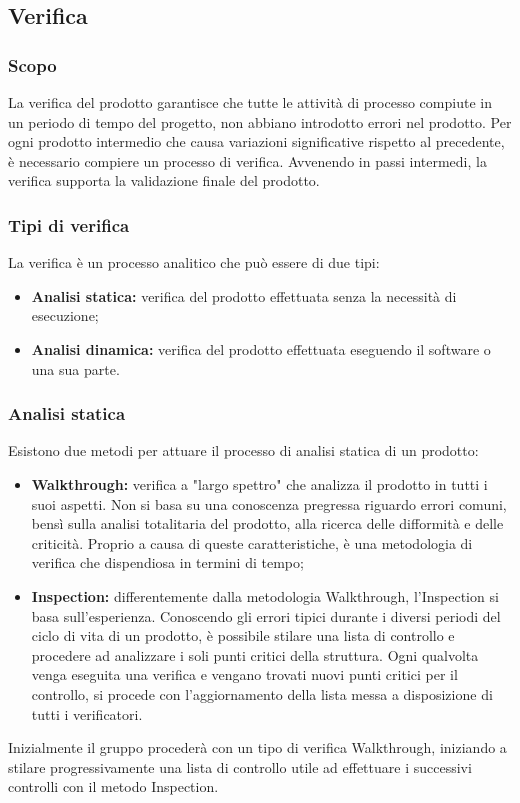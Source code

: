 \subsection{Verifica}
\subsubsection{Scopo}
La verifica del prodotto garantisce che tutte le attività di processo compiute in un periodo di tempo del progetto, non abbiano introdotto errori nel prodotto. Per ogni prodotto intermedio che causa variazioni significative rispetto al precedente, è necessario compiere un processo di verifica. Avvenendo in passi intermedi, la verifica supporta la validazione finale del prodotto.

\subsubsection{Tipi di verifica}
La verifica è un processo analitico che può essere di due tipi:
\begin{itemize}
	\item \textbf{Analisi statica:} verifica del prodotto effettuata senza la necessità di esecuzione; 
	\item \textbf{Analisi dinamica:} verifica del prodotto effettuata eseguendo il software o una sua parte.
\end{itemize}

\subsubsection{Analisi statica}
\noindent Esistono due metodi per attuare il processo di analisi statica di un prodotto:
\begin{itemize}
	\item \textbf{Walkthrough:} verifica a "largo spettro" che analizza il prodotto in tutti i suoi aspetti. Non si basa su una conoscenza pregressa riguardo errori comuni, bensì sulla analisi totalitaria del prodotto, alla ricerca delle difformità e delle criticità. Proprio a causa di queste caratteristiche, è una metodologia di verifica che dispendiosa in termini di tempo;
	\item \textbf{Inspection:} differentemente dalla metodologia Walkthrough, l'Inspection si basa sull'esperienza. Conoscendo gli errori tipici durante i diversi periodi del ciclo di vita di un prodotto, è possibile stilare una lista di controllo e procedere ad analizzare i soli punti critici della struttura. Ogni qualvolta venga eseguita una verifica e vengano trovati nuovi punti critici per il controllo, si procede con l'aggiornamento della lista messa a disposizione di tutti i verificatori.
\end{itemize}
Inizialmente il gruppo procederà con un tipo di verifica Walkthrough, iniziando a stilare progressivamente una lista di controllo utile ad effettuare i successivi controlli con il metodo Inspection.\\

